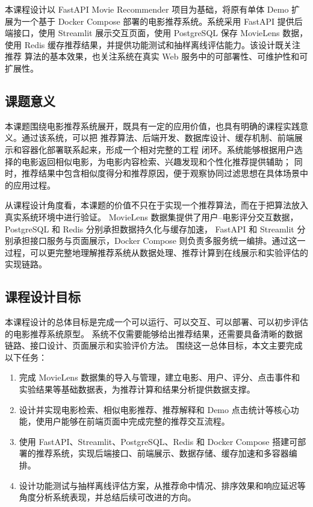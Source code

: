 本课程设计以 FastAPI Movie Recommender 项目为基础，将原有单体 Demo 扩展为一个基于 Docker Compose
部署的电影推荐系统。系统采用 FastAPI 提供后端接口，使用 Streamlit 展示交互页面，使用 PostgreSQL
保存 MovieLens 数据，使用 Redis 缓存推荐结果，并提供功能测试和抽样离线评估能力。该设计既关注推荐
算法的基本效果，也关注系统在真实 Web 服务中的可部署性、可维护性和可扩展性。

\subsection{课题意义}

本课题围绕电影推荐系统展开，既具有一定的应用价值，也具有明确的课程实践意义。通过该系统，可以把
推荐算法、后端开发、数据库设计、缓存机制、前端展示和容器化部署联系起来，形成一个相对完整的工程
闭环。系统能够根据用户选择的电影返回相似电影，为电影内容检索、兴趣发现和个性化推荐提供辅助；
同时，推荐结果中包含相似度得分和推荐原因，便于观察协同过滤思想在具体场景中的应用过程。

从课程设计角度看，本课题的价值不只在于实现一个推荐算法，而在于把算法放入真实系统环境中进行验证。
MovieLens 数据集提供了用户--电影评分交互数据，PostgreSQL 和 Redis 分别承担数据持久化与缓存加速，
FastAPI 和 Streamlit 分别承担接口服务与页面展示，Docker Compose 则负责多服务统一编排。通过这一
过程，可以更完整地理解推荐系统从数据处理、推荐计算到在线展示和实验评估的实现链路。

\subsection{课程设计目标}

本课程设计的总体目标是完成一个可以运行、可以交互、可以部署、可以初步评估的电影推荐系统原型。
系统不仅需要能够给出推荐结果，还需要具备清晰的数据链路、接口设计、页面展示和实验评价方法。
围绕这一总体目标，本文主要完成以下任务：

\begin{enumerate}[leftmargin=2em]
  \item 完成 MovieLens 数据集的导入与管理，建立电影、用户、评分、点击事件和实验结果等基础数据表，为推荐计算和结果分析提供数据支撑。
  \item 设计并实现电影检索、相似电影推荐、推荐解释和 Demo 点击统计等核心功能，使用户能够在前端页面中完成完整的推荐交互流程。
  \item 使用 FastAPI、Streamlit、PostgreSQL、Redis 和 Docker Compose 搭建可部署的推荐系统，实现后端接口、前端展示、数据存储、缓存加速和多容器编排。
  \item 设计功能测试与抽样离线评估方案，从推荐命中情况、排序效果和响应延迟等角度分析系统表现，并总结后续可改进的方向。
\end{enumerate}

\newpage

